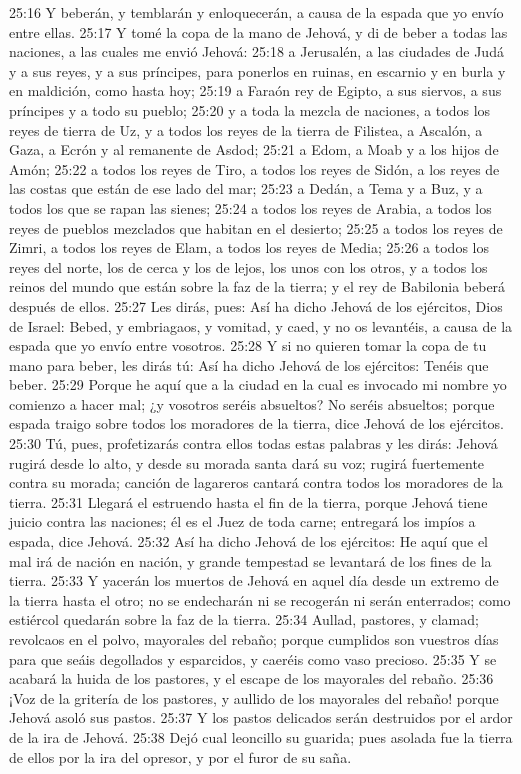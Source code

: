 25:16 Y beberán, y temblarán y enloquecerán, a causa de la espada que yo envío entre ellas.  
25:17 Y tomé la copa de la mano de Jehová, y di de beber a todas las naciones, a las cuales me envió Jehová:  
25:18 a Jerusalén, a las ciudades de Judá y a sus reyes, y a sus príncipes, para ponerlos en ruinas, en escarnio y en burla y en maldición, como hasta hoy;  
25:19 a Faraón rey de Egipto, a sus siervos, a sus príncipes y a todo su pueblo;  
25:20 y a toda la mezcla de naciones, a todos los reyes de tierra de Uz, y a todos los reyes de la tierra de Filistea, a Ascalón, a Gaza, a Ecrón y al remanente de Asdod;  
25:21 a Edom, a Moab y a los hijos de Amón;  
25:22 a todos los reyes de Tiro, a todos los reyes de Sidón, a los reyes de las costas que están de ese lado del mar;  
25:23 a Dedán, a Tema y a Buz, y a todos los que se rapan las sienes;  
25:24 a todos los reyes de Arabia, a todos los reyes de pueblos mezclados que habitan en el desierto;  
25:25 a todos los reyes de Zimri, a todos los reyes de Elam, a todos los reyes de Media;  
25:26 a todos los reyes del norte, los de cerca y los de lejos, los unos con los otros, y a todos los reinos del mundo que están sobre la faz de la tierra; y el rey de Babilonia beberá después de ellos.  
25:27 Les dirás, pues: Así ha dicho Jehová de los ejércitos, Dios de Israel: Bebed, y embriagaos, y vomitad, y caed, y no os levantéis, a causa de la espada que yo envío entre vosotros.  
25:28 Y si no quieren tomar la copa de tu mano para beber, les dirás tú: Así ha dicho Jehová de los ejércitos: Tenéis que beber.  
25:29 Porque he aquí que a la ciudad en la cual es invocado mi nombre yo comienzo a hacer mal; ¿y vosotros seréis absueltos? No seréis absueltos; porque espada traigo sobre todos los moradores de la tierra, dice Jehová de los ejércitos.  
25:30 Tú, pues, profetizarás contra ellos todas estas palabras y les dirás: Jehová rugirá desde lo alto, y desde su morada santa dará su voz; rugirá fuertemente contra su morada; canción de lagareros cantará contra todos los moradores de la tierra.  
25:31 Llegará el estruendo hasta el fin de la tierra, porque Jehová tiene juicio contra las naciones; él es el Juez de toda carne; entregará los impíos a espada, dice Jehová.  
25:32 Así ha dicho Jehová de los ejércitos: He aquí que el mal irá de nación en nación, y grande tempestad se levantará de los fines de la tierra.  
25:33 Y yacerán los muertos de Jehová en aquel día desde un extremo de la tierra hasta el otro; no se endecharán ni se recogerán ni serán enterrados; como estiércol quedarán sobre la faz de la tierra.  
25:34 Aullad, pastores, y clamad; revolcaos en el polvo, mayorales del rebaño; porque cumplidos son vuestros días para que seáis degollados y esparcidos, y caeréis como vaso precioso.  
25:35 Y se acabará la huida de los pastores, y el escape de los mayorales del rebaño. 
25:36 ¡Voz de la gritería de los pastores, y aullido de los mayorales del rebaño! porque Jehová asoló sus pastos.  
25:37 Y los pastos delicados serán destruidos por el ardor de la ira de Jehová.  
25:38 Dejó cual leoncillo su guarida; pues asolada fue la tierra de ellos por la ira del opresor, y por el furor de su saña.  

